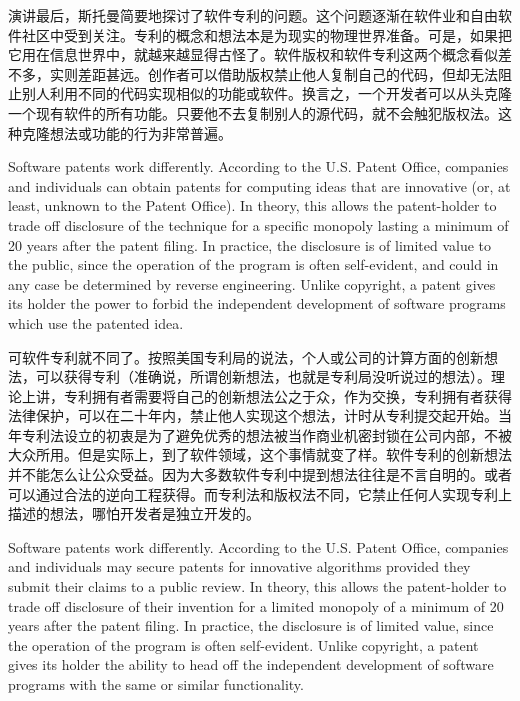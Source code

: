 \ifdefined\chs
演讲最后，斯托曼简要地探讨了软件专利的问题。这个问题逐渐在软件业和自由软件社区中受到关注。专利的概念和想法本是为现实的物理世界准备。可是，如果把它用在信息世界中，就越来越显得古怪了。软件版权和软件专利这两个概念看似差不多，实则差距甚远。创作者可以借助版权禁止他人复制自己的代码，但却无法阻止别人利用不同的代码实现相似的功能或软件。换言之，一个开发者可以从头克隆一个现有软件的所有功能。只要他不去复制别人的源代码，就不会触犯版权法。这种克隆想法或功能的行为非常普遍。
\fi
\fi

\ifdefined\vtwo
\ifdefined\eng
Software patents work differently. According to the U.S. Patent Office, companies and individuals can obtain patents for computing ideas that are innovative (or, at least, unknown to the Patent Office). In theory, this allows the patent-holder to trade off disclosure of the technique for a specific monopoly lasting a minimum of 20 years after the patent filing. In practice, the disclosure is of limited value to the public, since the operation of the program is often self-evident, and could in any case be determined by reverse engineering. Unlike copyright, a patent gives its holder the power to forbid the independent development of software programs which use the patented idea.
\fi

\ifdefined\chs
可软件专利就不同了。按照美国专利局的说法，个人或公司的计算方面的创新想法，可以获得专利（准确说，所谓创新想法，也就是专利局没听说过的想法）。理论上讲，专利拥有者需要将自己的创新想法公之于众，作为交换，专利拥有者获得法律保护，可以在二十年内，禁止他人实现这个想法，计时从专利提交起开始。当年专利法设立的初衷是为了避免优秀的想法被当作商业机密封锁在公司内部，不被大众所用。但是实际上，到了软件领域，这个事情就变了样。软件专利的创新想法并不能怎么让公众受益。因为大多数软件专利中提到想法往往是不言自明的。或者可以通过合法的逆向工程获得。而专利法和版权法不同，它禁止任何人实现专利上描述的想法，哪怕开发者是独立开发的。
\fi
\fi

\ifdefined\vone
\ifdefined\eng
Software patents work differently. According to the U.S. Patent Office, companies and individuals may secure patents for innovative algorithms provided they submit their claims to a public review. In theory, this allows the patent-holder to trade off disclosure of their invention for a limited monopoly of a minimum of 20 years after the patent filing. In practice, the disclosure is of limited value, since the operation of the program is often self-evident. Unlike copyright, a patent gives its holder the ability to head off the independent development of software programs with the same or similar functionality.
\fi

